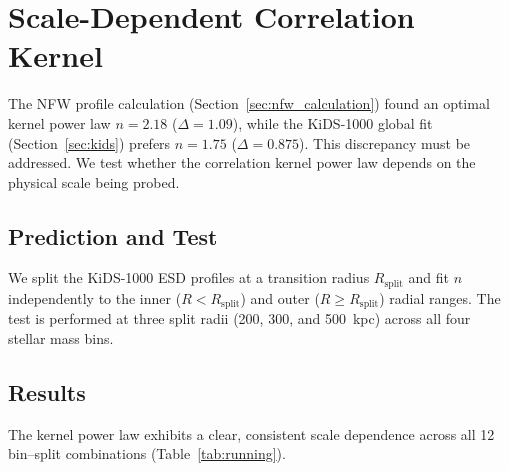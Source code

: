 \documentclass[12pt,a4paper]{article}
\begin{document}
\section{Scale-Dependent Correlation Kernel}
\label{sec:running}

The NFW profile calculation (Section~\ref{sec:nfw_calculation}) found an optimal kernel power law $n = 2.18$ ($\Delta = 1.09$), while the KiDS-1000 global fit (Section~\ref{sec:kids}) prefers $n = 1.75$ ($\Delta = 0.875$). This discrepancy must be addressed. We test whether the correlation kernel power law depends on the physical scale being probed.

\subsection{Prediction and Test}

We split the KiDS-1000 ESD profiles at a transition radius $R_{\mathrm{split}}$ and fit $n$ independently to the inner ($R < R_{\mathrm{split}}$) and outer ($R \geq R_{\mathrm{split}}$) radial ranges. The test is performed at three split radii (200, 300, and 500~kpc) across all four stellar mass bins.

\subsection{Results}

The kernel power law exhibits a clear, consistent scale dependence across all 12 bin--split combinations (Table~\ref{tab:running}).
\end{document}
